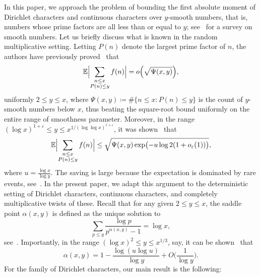 \documentclass[a4paper,12pt,reqno]{amsart}
\newcommand{\E}{\mathbb{E}}
\begin{document}
In this paper, we approach the problem of bounding the first absolute moment of Dirichlet characters and continuous characters over $y$-smooth numbers, that is, numbers whose prime factors are all less than or equal to $y$; see~\cite{GranvilleSmooths} for a survey on smooth numbers. Let us briefly discuss what is known in the random multiplicative setting. Letting $P(n)$ denote the largest prime factor of $n$, the authors have previously proved~\cite[Theorem~1.1]{HardyXu} that
\[
\E \Bigl| \sum_{\substack{n \leq x \\ P(n) \leq y}} f(n) \Bigr| = o \Bigl( \sqrt{\Psi(x,y)} \Bigr),
\]
uniformly $2 \leq y \leq x$, where $\Psi(x,y) \coloneqq \# \{ n \leq x : P(n) \leq y\}$ is the count of $y$-smooth numbers below $x$, thus beating the square-root bound uniformly on the entire range of smoothness parameter. Moreover, in the range $(\log x)^{1 + \varepsilon} \leq y \leq x^{1/(\log \log x)^{1 + \varepsilon}}$, it was shown~\cite[Theorem~1.2]{HardyXu} that
\[
\E \Bigl| \sum_{\substack{n \leq x \\ P(n) \leq y}} f(n) \Bigr| \leq \sqrt{\Psi(x,y) \exp \bigl(- u \log 2 (1 + o_{\varepsilon} (1)) \bigr)},
\]
where $u = \frac{\log x}{\log y}$. The saving is large because the expectation is dominated by rare events, see~\cite[Section~1.3]{HardyXu}. In the present paper, we adapt this argument to the deterministic setting of Dirichlet characters, continuous characters, and completely multiplicative twists of these. Recall that for any given $2 \leq y \leq x$, the saddle point $\alpha(x,y)$ is defined as the unique solution to
\begin{equation}\label{equ: saddle defn}
\sum_{p \leq y} \frac{\log p}{p^{\alpha(x,y)} - 1} = \log x,
\end{equation}
see~\cite[Equation~(2.2)]{HildTen86}. Importantly, in the range $(\log x)^2 \leq y \leq x^{1/3}$, say, it can be shown~\cite[Lemmas~2 and~3]{HildTen86} that
\begin{equation}\label{equ: saddle point est}
\alpha (x,y) = 1 - \frac{\log (u \log u)}{\log y} + O \biggl( \frac{1}{\log y} \biggr).
\end{equation}
For the family of Dirichlet characters, our main result is the following:
\end{document}
